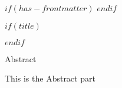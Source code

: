 $if(has-frontmatter)$
\frontmatter
$endif$

$if(title)$
\maketitle
$endif$

\newpage


\begin{center}
\Large{Abstract}
\end{center}

\vspace*{\baselineskip}

This is the Abstract part

\newpage



